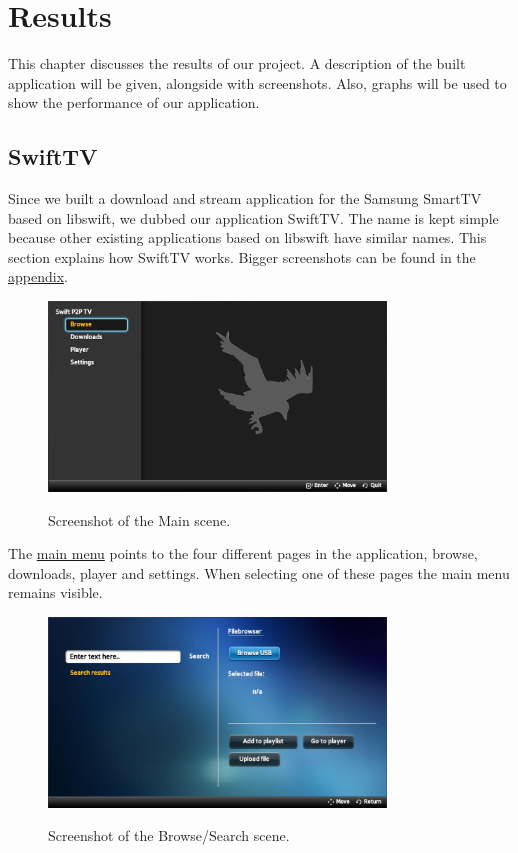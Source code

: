 \chapter{Results}
This chapter discusses the results of our project. A description of the built application will be given, alongside with screenshots.
Also, graphs will be used to show the performance of our application.

\section{SwiftTV}
Since we built a download and stream application for the Samsung SmartTV based on libswift, we dubbed our application SwiftTV.
The name is kept simple because other existing applications based on libswift have similar names. This section explains how SwiftTV works.
Bigger screenshots can be found in the \hyperref[sec:screenshots]{appendix}.

\begin{center}
\begin{figure}[h!]
	\centering
	\mbox{\includegraphics[width=0.8\textwidth]{Images/MainScene.jpg}}
	\label{fig:main}
	\caption{Screenshot of the Main scene.}
\end{figure}
\end{center}

The \hyperref[fig:main]{main menu} points to the four different pages in the application, browse, downloads, player and settings. When selecting one of these pages the main menu remains visible.

\begin{center}
\begin{figure}[h]
	\centering
	\mbox{\includegraphics[width=0.8\textwidth]{Images/BrowseScene.jpg}}
	\label{fig:browse}
	\caption{Screenshot of the Browse/Search scene.}
\end{figure}
\end{center}

